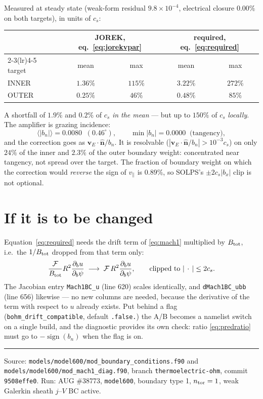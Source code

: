 \documentclass[11pt,a4paper]{article}
\newcommand{\code}[1]{\texttt{\small #1}}
\newcommand{\nhat}{\hat{\bm{n}}}
\newcommand{\vE}{\bm{v}_E}
\begin{document}
Measured at steady state (weak-form residual $9.8\times10^{-4}$, electrical closure $0.00\%$ on
both targets), in units of $c_s$:

\begin{center}
\begin{tabular}{lcccc}
\toprule
& \multicolumn{2}{c}{JOREK, eq.~\eqref{eq:jorekvpar}} & \multicolumn{2}{c}{required, eq.~\eqref{eq:required}} \\
\cmidrule(lr){2-3}\cmidrule(lr){4-5}
target & mean & max & mean & max \\
\midrule
INNER & $1.36\%$ & $115\%$ & $3.22\%$ & $272\%$ \\
OUTER & $0.25\%$ & $ 46\%$ & $0.48\%$ & $ 85\%$ \\
\bottomrule
\end{tabular}
\end{center}

\noindent A shortfall of $1.9\%$ and $0.2\%$ of $c_s$ \emph{in the mean} --- but up to $150\%$
of $c_s$ \emph{locally}.  The amplifier is grazing incidence:
\begin{equation}
  \langle|b_n|\rangle = 0.0080 \;\;(0.46^\circ), \qquad \min|b_n| = 0.0000 \;\;\text{(tangency)},
\end{equation}
and the correction goes as $\vE\cdot\nhat/b_n$.  It is resolvable
($|\vE\cdot\nhat/b_n| > 10^{-3}c_s$) on only $24\%$ of the inner and $2.3\%$ of the outer
boundary weight: concentrated near tangency, not spread over the target.  The fraction of
boundary weight on which the correction would \emph{reverse} the sign of $v_\parallel$ is
$0.89\%$, so SOLPS's $\pm 2c_s|b_x|$ clip is not optional.

\section{If it is to be changed}
\label{sec:fix}

Equation~\eqref{eq:required} needs the drift term of \eqref{eq:mach1} multiplied by
$B_{\rm tot}$, i.e.\ the $1/B_{\rm tot}$ dropped from that term only:
\begin{equation}
  \frac{\mathcal{F}}{B_{\rm tot}}R^2\frac{\partial_b u}{\partial_b\psi}
  \;\longrightarrow\;
  \mathcal{F}\,R^2\frac{\partial_b u}{\partial_b\psi},
  \qquad\text{clipped to } |\,\cdot\,| \le 2c_s .
\end{equation}
The Jacobian entry \code{Mach1BC\_u} (line 620) scales identically, and
\code{dMach1BC\_ubb} (line 656) likewise --- no new columns are needed, because the derivative
of the term with respect to $u$ already exists.  Put behind a flag
(\code{bohm\_drift\_compatible}, default \code{.false.}) the A/B becomes a namelist switch on a
single build, and the diagnostic provides its own check: ratio \eqref{eq:predratio} must go to
$-\operatorname{sign}(b_n)$ when the flag is on.

\vspace{1em}
\hrule
\vspace{0.6em}
\noindent\footnotesize
Source: \code{models/model600/mod\_boundary\_conditions.f90} and
\code{models/model600/mod\_mach1\_diag.f90}, branch \code{thermoelectric-ohm},
commit \code{9508effe0}.  Run: AUG \#38773, \code{model600}, boundary type 1, $n_{\rm tor}=1$,
weak Galerkin sheath $j$--$V$ BC active.
\end{document}
